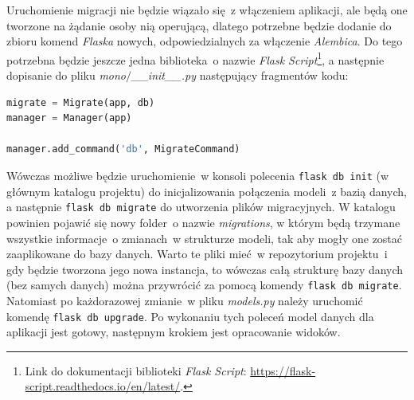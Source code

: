 Uruchomienie migracji nie będzie wiązało się~z włączeniem aplikacji\cite{Grinberg:2017}, ale będą one tworzone na żądanie osoby nią operującą, dlatego potrzebne będzie dodanie do zbioru komend \textit{Flaska}\cite{flask} nowych, odpowiedzialnych za włączenie \textit{Alembica}. Do tego potrzebna będzie jeszcze jedna biblioteka~o nazwie \textit{Flask Script}\footnote{Link do dokumentacji biblioteki \textit{Flask Script}: \url{https://flask-script.readthedocs.io/en/latest/}.}, a następnie dopisanie do pliku \textit{mono$/$\_\_init\_\_.py} następujący fragmentów kodu:
 
\begin{lstlisting}[language=Python, caption={Dodanie migracji do skryptu \textit{Flaska} w pliku \textit{mono$/$\_\_init\_\_.py}.}]
migrate = Migrate(app, db)
manager = Manager(app)

manager.add_command('db', MigrateCommand) 
\end{lstlisting}

Wówczas możliwe będzie uruchomienie~w konsoli polecenia \verb|flask db init| (w głównym katalogu projektu) do inicjalizowania połączenia modeli~z bazią danych, a następnie \verb|flask db migrate| do utworzenia plików migracyjnych. W katalogu powinien pojawić się nowy folder~o nazwie \textit{migrations}, w którym będą trzymane wszystkie informacje~o zmianach~w strukturze modeli, tak aby mogły one zostać zaaplikowane do bazy danych. Warto te pliki mieć~w repozytorium projektu~i gdy będzie tworzona jego nowa instancja, to wówczas całą strukturę bazy danych (bez samych danych) można przywrócić za pomocą komendy \verb|flask db migrate|. Natomiast po każdorazowej zmianie~w pliku \textit{models.py} należy uruchomić komendę \verb|flask db upgrade|.
Po wykonaniu tych poleceń model danych dla aplikacji jest gotowy, następnym krokiem jest opracowanie widoków.

